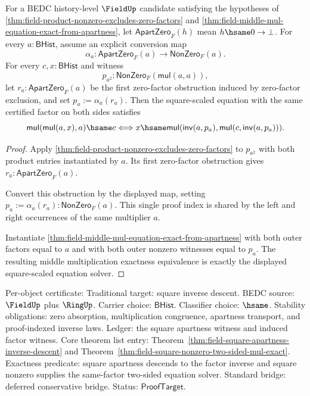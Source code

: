\begin{theorem}
\label{thm:field-square-nonzero-two-sided-mul-exact}
For a BEDC history-level $\FieldUp$ candidate satisfying the hypotheses of
\autoref{thm:field-product-nonzero-excludes-zero-factors} and
\autoref{thm:field-middle-mul-equation-exact-from-apartness}, let
$\mathsf{ApartZero}_F(h)$ mean $h\hsame0\to\bot$. For every
$a:\mathsf{BHist}$, assume an explicit conversion map
$$
\alpha_a:\mathsf{ApartZero}_F(a)\to\mathsf{NonZero}_F(a).
$$
For every $c,x:\mathsf{BHist}$ and witness
$$
p_{a^2}:\mathsf{NonZero}_F(\mathsf{mul}(a,a)),
$$
let $r_a:\mathsf{ApartZero}_F(a)$ be the first zero-factor obstruction induced
by zero-factor exclusion, and set $p_a:=\alpha_a(r_a)$. Then the
square-scaled equation with the same certified factor on both sides satisfies
$$
\mathsf{mul}(\mathsf{mul}(a,x),a)\hsame c
\Longleftrightarrow
x\hsame
\mathsf{mul}(\mathsf{inv}(a,p_a),\mathsf{mul}(c,\mathsf{inv}(a,p_a))).
$$
\end{theorem}
\begin{proof}
Apply \autoref{thm:field-product-nonzero-excludes-zero-factors} to
$p_{a^2}$ with both product entries instantiated by $a$. Its first
zero-factor obstruction gives $r_a:\mathsf{ApartZero}_F(a)$.

Convert this obstruction by the displayed map, setting
$p_a:=\alpha_a(r_a):\mathsf{NonZero}_F(a)$. This single proof index is shared
by the left and right occurrences of the same multiplier $a$.

Instantiate
\autoref{thm:field-middle-mul-equation-exact-from-apartness} with both outer
factors equal to $a$ and with both outer nonzero witnesses equal to $p_a$.
The resulting middle multiplication exactness equivalence is exactly the
displayed square-scaled equation solver.
\end{proof}

Per-object certificate: Traditional target: square inverse descent. BEDC
source: $\FieldUp$ plus $\RingUp$. Carrier choice: $\mathsf{BHist}$.
Classifier choice: $\hsame$. Stability obligations: zero absorption,
multiplication congruence, apartness transport, and proof-indexed inverse
laws. Ledger: the square apartness witness and induced factor witness. Core
theorem list entry:
Theorem~\ref{thm:field-square-apartness-inverse-descent} and
Theorem~\ref{thm:field-square-nonzero-two-sided-mul-exact}. Exactness
predicate: square apartness descends to the factor inverse and square
nonzero supplies the same-factor two-sided equation solver. Standard bridge:
deferred conservative bridge. Status: $\mathsf{ProofTarget}$.
